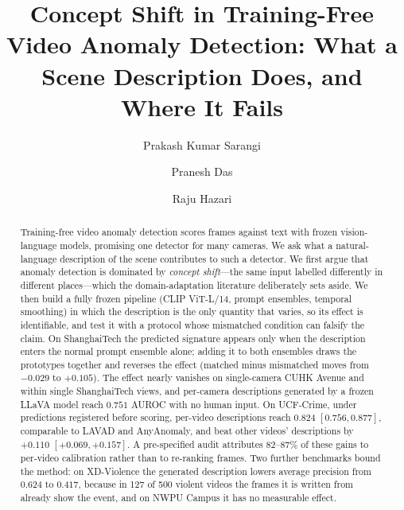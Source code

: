 \documentclass[a4paper,fleqn]{cas-sc}
\begin{document}
\let\WriteBookmarks\relax
\def\floatpagepagefraction{1}
\def\textpagefraction{.001}


\title[mode = title]{Concept Shift in Training-Free Video Anomaly Detection: What
a Scene Description Does, and Where It Fails}

\author[1]{Prakash Kumar Sarangi}


\author[1]{Pranesh Das}

\author[1]{Raju Hazari}


\begin{abstract}
Training-free video anomaly detection scores frames against text with frozen
vision-language models, promising one detector for many cameras. We ask what a natural-language description of the scene
contributes to such a detector. We first argue that anomaly detection is dominated
by \emph{concept shift}---the same input labelled differently in different
places---which the domain-adaptation literature deliberately sets aside. We then
build a fully frozen pipeline (CLIP ViT-L/14, prompt ensembles, temporal smoothing)
in which the description is the only quantity that varies, so its effect is
identifiable, and test it with a protocol whose mismatched condition can falsify
the claim. On ShanghaiTech the predicted signature appears only when the description
enters the normal prompt ensemble alone; adding it to both ensembles draws the
prototypes together and reverses the effect (matched minus mismatched moves from
$-0.029$ to $+0.105$). The effect nearly vanishes on single-camera CUHK Avenue and
within single ShanghaiTech views, and per-camera descriptions generated by a frozen
LLaVA model reach $0.751$ AUROC with no human input. On UCF-Crime, under predictions
registered before scoring, per-video descriptions reach $0.824$ $[0.756, 0.877]$,
comparable to LAVAD and AnyAnomaly, and beat other videos' descriptions by $+0.110$
$[+0.069, +0.157]$. A pre-specified audit attributes $82$--$87\%$ of these gains to
per-video calibration rather than to re-ranking frames. Two further benchmarks bound
the method: on XD-Violence the generated description lowers average precision from
$0.624$ to $0.417$, because in 127 of 500 violent videos the frames it is written
from already show the event, and on NWPU Campus it has no measurable effect.
\end{abstract}
\end{document}
